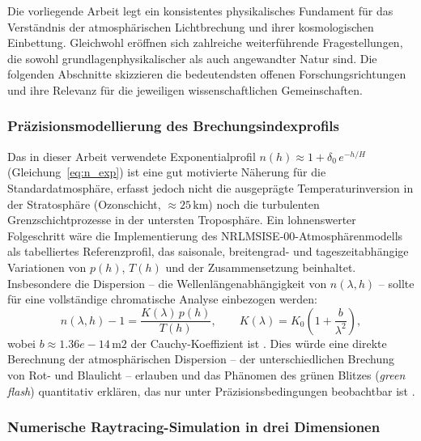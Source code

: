 \documentclass[12pt,a4paper]{article}
\providecommand{\SI}[2]{\ensuremath{#1\,#2}}
\providecommand{\kilo}{\mathrm{k}}
\providecommand{\squared}{2}
\providecommand{\metre}{\mathrm{m}}
\begin{document}
Die vorliegende Arbeit legt ein konsistentes physikalisches Fundament
für das Verständnis der atmosphärischen Lichtbrechung und ihrer
kosmologischen Einbettung.
Gleichwohl eröffnen sich zahlreiche weiterführende Fragestellungen,
die sowohl grundlagenphysikalischer als auch angewandter Natur sind.
Die folgenden Abschnitte skizzieren die bedeutendsten offenen
Forschungsrichtungen und ihre Relevanz für die jeweiligen wissenschaftlichen
Gemeinschaften.

\subsubsection{Präzisionsmodellierung des Brechungsindexprofils}

Das in dieser Arbeit verwendete Exponentialprofil $n(h) \approx 1 +
\delta_0\,e^{-h/H}$ (Gleichung~\ref{eq:n_exp}) ist eine gut motivierte
Näherung für die Standardatmosphäre, erfasst jedoch nicht die
ausgeprägte Temperaturinversion in der Stratosphäre (Ozonschicht,
$\approx\SI{25}{\kilo\metre}$) noch die turbulenten Grenzschicht\-prozesse
in der untersten Troposphäre.
Ein lohnenswerter Folgeschritt wäre die Implementierung des
NRLMSISE-00-Atmosphärenmodells \citep{Picone2002} als tabelliertes
Referenzprofil, das saisonale, breitengrad- und tageszeit\-abhängige
Variationen von $p(h)$, $T(h)$ und der Zusammensetzung beinhaltet.
Insbesondere die Dispersion -- die Wellenlängenabhängigkeit von
$n(\lambda, h)$ -- sollte für eine vollständige chromatische
Analyse einbezogen werden:
\begin{equation}
  n(\lambda,h) - 1
  = \frac{K(\lambda)\,p(h)}{T(h)},
  \qquad
  K(\lambda) = K_0\!\left(1 + \frac{b}{\lambda^2}\right),
  \label{eq:dispersion}
\end{equation}
wobei $b \approx \SI{1.36e-14}{\metre\squared}$ der
Cauchy-Koeffizient ist \citep{BornWolf1999}.
Dies würde eine direkte Berechnung der atmosphärischen Dispersion
-- der unterschiedlichen Brechung von Rot- und Blaulicht -- erlauben
und das Phänomen des grünen Blitzes (\emph{green flash}) quantitativ
erklären, das nur unter Präzisionsbedingungen beobachtbar ist
\citep{Greenler1980}.

\subsubsection{Numerische Raytracing-Simulation in drei Dimensionen}
\end{document}
